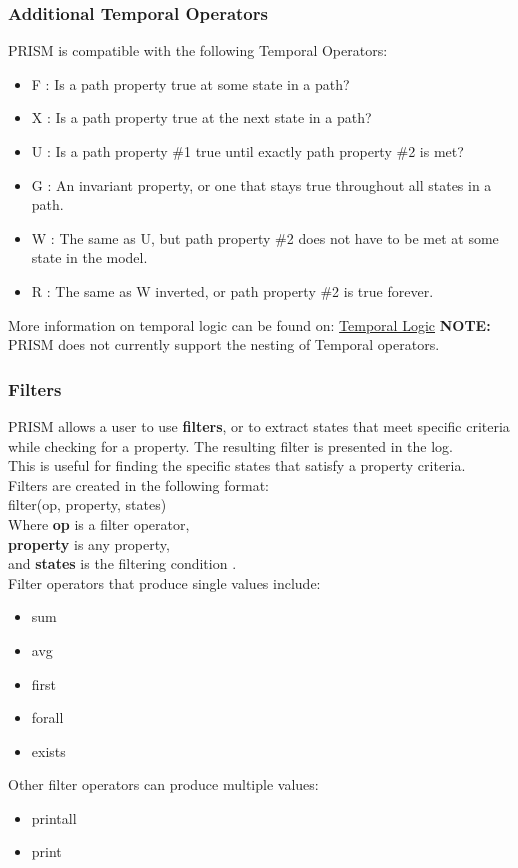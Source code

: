 \documentclass[a4paper]{article}
\begin{document}
\subsubsection{Additional Temporal Operators}
PRISM is compatible with the following Temporal Operators:
\begin{itemize}
\item F : Is a path property true at some state in a path?
\item X : Is a path property true at the next state in a path?
\item U : Is a path property \#1 true until exactly path property \#2 is met?
\item G : An invariant property, or one that stays true throughout all states in a path. 
\item W : The same as U, but path property \#2 does not have to be met at some state in the model.
\item R : The same as W inverted, or path property \#2 is true forever.
\end{itemize}
More information on temporal logic can be found on: \href{https://www.cl.cam.ac.uk/~djg11/pubs/temporal.html}{Temporal Logic}
\newline
\textbf{NOTE:} PRISM does not currently support the nesting of Temporal operators. 


\subsubsection{Filters}

PRISM allows a user to use \textbf{filters}, or to extract states that meet specific criteria while checking for a property. The resulting filter is presented in the log. 
\\[1\baselineskip]
This is useful for finding the specific states that satisfy a property criteria. 
\\[1\baselineskip]
Filters are created in the following format:
\\[1\baselineskip]
filter(op, property, states)
\\[1\baselineskip]
Where
\textbf{op} is a filter operator,
\\[1\baselineskip]
\textbf{property} is any property,
\\[1\baselineskip]
and \textbf{states} is the filtering condition .
\\[1\baselineskip]
Filter operators that produce single values include: 

\begin{itemize}
\item sum
\item avg
\item first
\item forall
\item exists
\end{itemize}
Other filter operators can produce multiple values: 
\begin{itemize}
\item printall
\item print
\end{itemize}
\end{document}
